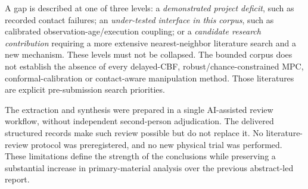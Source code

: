 A gap is described at one of three levels: a \emph{demonstrated project deficit},
such as recorded contact failures; an \emph{under-tested interface in this corpus},
such as calibrated observation-age/execution coupling; or a \emph{candidate
research contribution} requiring a more extensive nearest-neighbor literature
search and a new mechanism. These levels must not be collapsed. The bounded
corpus does not establish the absence of every delayed-CBF, robust/chance-constrained
MPC, conformal-calibration or contact-aware manipulation method. Those literatures
are explicit pre-submission search priorities.

The extraction and synthesis were prepared in a single AI-assisted review
workflow, without independent second-person adjudication. The delivered structured
records make such review possible but do not replace it. No literature-review
protocol was preregistered, and no new physical trial was performed. These
limitations define the strength of the conclusions while preserving a substantial
increase in primary-material analysis over the previous abstract-led report.
